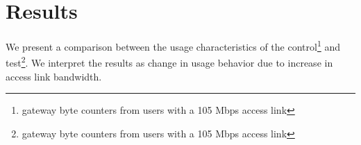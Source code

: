\section{Results}
\label{sec:results}



We present a comparison between the usage characteristics of the control\footnote{gateway byte counters from users with a 105 Mbps access link} and test\footnote{gateway byte counters from users with a 105 Mbps access link}. We interpret the results as change in usage behavior due to increase in access link bandwidth. %


